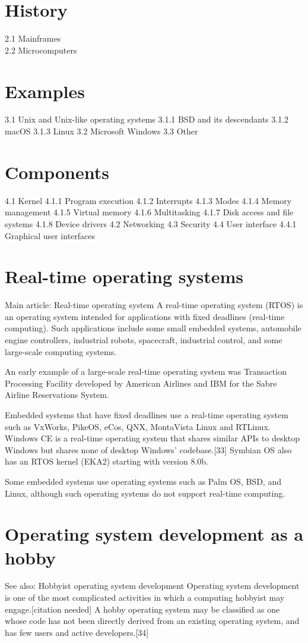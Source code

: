 \documentclass[oneside, 11 pt]{report}
\begin{document}
\section{History}

2.1	Mainframes\\
2.2	Microcomputers\\
\section{Examples}

3.1	Unix and Unix-like operating systems
3.1.1	BSD and its descendants
3.1.2	macOS
3.1.3	Linux
3.2	Microsoft Windows
3.3	Other
\section{Components}

4.1	Kernel
4.1.1	Program execution
4.1.2	Interrupts
4.1.3	Modes
4.1.4	Memory management
4.1.5	Virtual memory
4.1.6	Multitasking
4.1.7	Disk access and file systems
4.1.8	Device drivers
4.2	Networking
4.3	Security
4.4	User interface
4.4.1	Graphical user interfaces
\section{Real-time operating systems}
Main article: Real-time operating system
A real-time operating system (RTOS) is an operating system intended for applications with fixed deadlines (real-time computing). Such applications include some small embedded systems, automobile engine controllers, industrial robots, spacecraft, industrial control, and some large-scale computing systems.

An early example of a large-scale real-time operating system was Transaction Processing Facility developed by American Airlines and IBM for the Sabre Airline Reservations System.

Embedded systems that have fixed deadlines use a real-time operating system such as VxWorks, PikeOS, eCos, QNX, MontaVista Linux and RTLinux. Windows CE is a real-time operating system that shares similar APIs to desktop Windows but shares none of desktop Windows' codebase.[33] Symbian OS also has an RTOS kernel (EKA2) starting with version 8.0b.

Some embedded systems use operating systems such as Palm OS, BSD, and Linux, although such operating systems do not support real-time computing.
\section{Operating system development as a hobby}
See also: Hobbyist operating system development
Operating system development is one of the most complicated activities in which a computing hobbyist may engage.[citation needed] A hobby operating system may be classified as one whose code has not been directly derived from an existing operating system, and has few users and active developers.[34]
\end{document}
